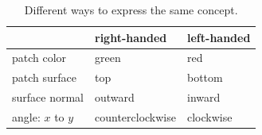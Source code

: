 \begin{table}[htdp]
\begin{center}
\begin{tabular}{l|ll}
 & right-handed & left-handed   \\\hline
 patch color    & green   & red \\\hline
 patch surface  & top & bottom  \\\hline
 surface normal & outward & inward \\\hline
 angle: $x$ to $y$ & counterclockwise & clockwise \\\hline
\end{tabular}
\end{center}
\label{tab:chiral:youarerighthandedif}
\caption{Different ways to express the same concept.}
\end{table}%

